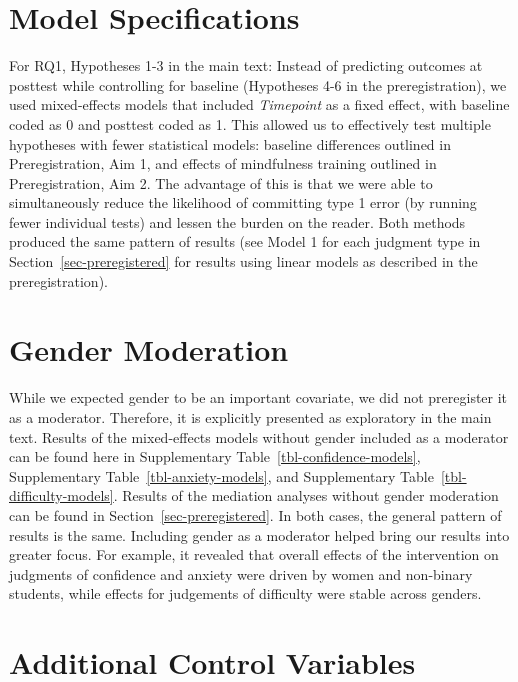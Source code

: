 \documentclass[
  letterpaper,
  DIV=11,
  numbers=noendperiod]{scrreprt}
\begin{document}
\section{Model Specifications}\label{model-specifications}

For RQ1, Hypotheses 1-3 in the main text: Instead of predicting outcomes
at posttest while controlling for baseline (Hypotheses 4-6 in the
preregistration), we used mixed-effects models that included
\emph{Timepoint} as a fixed effect, with baseline coded as 0 and
posttest coded as 1. This allowed us to effectively test multiple
hypotheses with fewer statistical models: baseline differences outlined
in Preregistration, Aim 1, and effects of mindfulness training outlined
in Preregistration, Aim 2. The advantage of this is that we were able to
simultaneously reduce the likelihood of committing type 1 error (by
running fewer individual tests) and lessen the burden on the reader.
Both methods produced the same pattern of results (see Model 1 for each
judgment type in Section~\ref{sec-preregistered} for results using
linear models as described in the preregistration).

\section{Gender Moderation}\label{gender-moderation}

While we expected gender to be an important covariate, we did not
preregister it as a moderator. Therefore, it is explicitly presented as
exploratory in the main text. Results of the mixed-effects models
without gender included as a moderator can be found here in
Supplementary Table~\ref{tbl-confidence-models}, Supplementary
Table~\ref{tbl-anxiety-models}, and Supplementary
Table~\ref{tbl-difficulty-models}. Results of the mediation analyses
without gender moderation can be found in
Section~\ref{sec-preregistered}. In both cases, the general pattern of
results is the same. Including gender as a moderator helped bring our
results into greater focus. For example, it revealed that overall
effects of the intervention on judgments of confidence and anxiety were
driven by women and non-binary students, while effects for judgements of
difficulty were stable across genders.

\section{Additional Control
Variables}\label{additional-control-variables}
\end{document}

